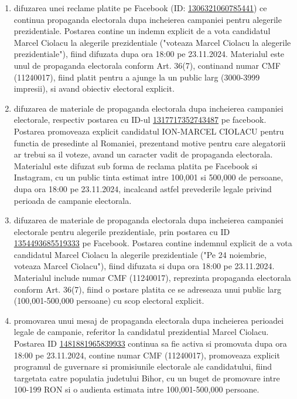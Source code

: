 \documentclass[a4paper,12pt]{article}
\begin{document}
\begin{enumerate}[leftmargin=*, label=\arabic*.)]
    \item difuzarea unei reclame platite pe Facebook (ID: \href{https://www.facebook.com/ads/library/?id=1306321060785441}{1306321060785441}) ce continua propaganda electorala dupa incheierea campaniei pentru alegerile prezidentiale. Postarea contine un indemn explicit de a vota candidatul Marcel Ciolacu la alegerile prezidentiale ("voteaza Marcel Ciolacu la alegerile prezidentiale"), fiind difuzata dupa ora 18:00 pe 23.11.2024. Materialul este unul de propaganda electorala conform Art. 36(7), continand numar CMF (11240017), fiind platit pentru a ajunge la un public larg (3000-3999 impresii), si avand obiectiv electoral explicit.
    \item difuzarea de materiale de propaganda electorala dupa incheierea campaniei electorale, respectiv postarea cu ID-ul \href{https://www.facebook.com/ads/library/?id=1317717352743487}{1317717352743487} pe facebook. Postarea promoveaza explicit candidatul ION-MARCEL CIOLACU pentru functia de presedinte al Romaniei, prezentand motive pentru care alegatorii ar trebui sa il voteze, avand un caracter vadit de propaganda electorala. Materialul este difuzat sub forma de reclama platita pe Facebook si Instagram, cu un public tinta estimat intre 100,001 si 500,000 de persoane, dupa ora 18:00 pe 23.11.2024, incalcand astfel prevederile legale privind perioada de campanie electorala.
    \item difuzarea de materiale de propaganda electorala dupa incheierea campaniei electorale pentru alegerile prezidentiale, prin postarea cu ID \href{https://www.facebook.com/ads/library/?id=1354493685519333}{1354493685519333} pe Facebook. Postarea contine indemnul explicit de a vota candidatul Marcel Ciolacu la alegerile prezidentiale ("Pe 24 noiembrie, voteaza Marcel Ciolacu"), fiind difuzata si dupa ora 18:00 pe 23.11.2024. Materialul include numar CMF (11240017), reprezinta propaganda electorala conform Art. 36(7), fiind o postare platita ce se adreseaza unui public larg (100,001-500,000 persoane) cu scop electoral explicit.
    \item promovarea unui mesaj de propaganda electorala dupa incheierea perioadei legale de campanie, referitor la candidatul prezidential Marcel Ciolacu. Postarea ID \href{https://www.facebook.com/ads/library/?id=1481881965839933}{1481881965839933} continua sa fie activa si promovata dupa ora 18:00 pe 23.11.2024, contine numar CMF (11240017), promoveaza explicit programul de guvernare si promisiunile electorale ale candidatului, fiind targetata catre populatia judetului Bihor, cu un buget de promovare intre 100-199 RON si o audienta estimata intre 100,001-500,000 persoane.

\end{enumerate}
\end{document}
